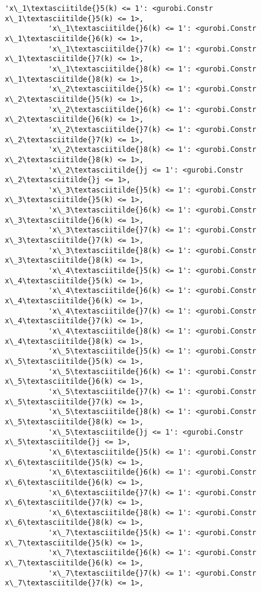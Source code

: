\documentclass[11pt]{article}
\begin{document}
\begin{Verbatim}[commandchars=\\\{\}]
          'x\_1\textasciitilde{}5(k) <= 1': <gurobi.Constr x\_1\textasciitilde{}5(k) <= 1>,
          'x\_1\textasciitilde{}6(k) <= 1': <gurobi.Constr x\_1\textasciitilde{}6(k) <= 1>,
          'x\_1\textasciitilde{}7(k) <= 1': <gurobi.Constr x\_1\textasciitilde{}7(k) <= 1>,
          'x\_1\textasciitilde{}8(k) <= 1': <gurobi.Constr x\_1\textasciitilde{}8(k) <= 1>,
          'x\_2\textasciitilde{}5(k) <= 1': <gurobi.Constr x\_2\textasciitilde{}5(k) <= 1>,
          'x\_2\textasciitilde{}6(k) <= 1': <gurobi.Constr x\_2\textasciitilde{}6(k) <= 1>,
          'x\_2\textasciitilde{}7(k) <= 1': <gurobi.Constr x\_2\textasciitilde{}7(k) <= 1>,
          'x\_2\textasciitilde{}8(k) <= 1': <gurobi.Constr x\_2\textasciitilde{}8(k) <= 1>,
          'x\_2\textasciitilde{}j <= 1': <gurobi.Constr x\_2\textasciitilde{}j <= 1>,
          'x\_3\textasciitilde{}5(k) <= 1': <gurobi.Constr x\_3\textasciitilde{}5(k) <= 1>,
          'x\_3\textasciitilde{}6(k) <= 1': <gurobi.Constr x\_3\textasciitilde{}6(k) <= 1>,
          'x\_3\textasciitilde{}7(k) <= 1': <gurobi.Constr x\_3\textasciitilde{}7(k) <= 1>,
          'x\_3\textasciitilde{}8(k) <= 1': <gurobi.Constr x\_3\textasciitilde{}8(k) <= 1>,
          'x\_4\textasciitilde{}5(k) <= 1': <gurobi.Constr x\_4\textasciitilde{}5(k) <= 1>,
          'x\_4\textasciitilde{}6(k) <= 1': <gurobi.Constr x\_4\textasciitilde{}6(k) <= 1>,
          'x\_4\textasciitilde{}7(k) <= 1': <gurobi.Constr x\_4\textasciitilde{}7(k) <= 1>,
          'x\_4\textasciitilde{}8(k) <= 1': <gurobi.Constr x\_4\textasciitilde{}8(k) <= 1>,
          'x\_5\textasciitilde{}5(k) <= 1': <gurobi.Constr x\_5\textasciitilde{}5(k) <= 1>,
          'x\_5\textasciitilde{}6(k) <= 1': <gurobi.Constr x\_5\textasciitilde{}6(k) <= 1>,
          'x\_5\textasciitilde{}7(k) <= 1': <gurobi.Constr x\_5\textasciitilde{}7(k) <= 1>,
          'x\_5\textasciitilde{}8(k) <= 1': <gurobi.Constr x\_5\textasciitilde{}8(k) <= 1>,
          'x\_5\textasciitilde{}j <= 1': <gurobi.Constr x\_5\textasciitilde{}j <= 1>,
          'x\_6\textasciitilde{}5(k) <= 1': <gurobi.Constr x\_6\textasciitilde{}5(k) <= 1>,
          'x\_6\textasciitilde{}6(k) <= 1': <gurobi.Constr x\_6\textasciitilde{}6(k) <= 1>,
          'x\_6\textasciitilde{}7(k) <= 1': <gurobi.Constr x\_6\textasciitilde{}7(k) <= 1>,
          'x\_6\textasciitilde{}8(k) <= 1': <gurobi.Constr x\_6\textasciitilde{}8(k) <= 1>,
          'x\_7\textasciitilde{}5(k) <= 1': <gurobi.Constr x\_7\textasciitilde{}5(k) <= 1>,
          'x\_7\textasciitilde{}6(k) <= 1': <gurobi.Constr x\_7\textasciitilde{}6(k) <= 1>,
          'x\_7\textasciitilde{}7(k) <= 1': <gurobi.Constr x\_7\textasciitilde{}7(k) <= 1>,

\end{Verbatim}
\end{document}
